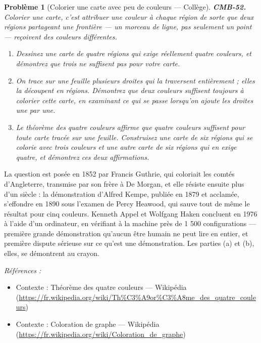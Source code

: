 \documentclass[11pt]{article}
\newtheorem{problem}{Problème}
\newenvironment{refs}{\par\small\noindent\emph{Références :}\begin{itemize}\setlength\itemsep{0pt}}{\end{itemize}\normalsize}
\begin{document}
\begin{problem}[{Colorier une carte avec peu de couleurs --- Collège}]
\textbf{CMB-52.} Colorier une carte, c'est attribuer une couleur à chaque région de sorte que
deux régions partageant une frontière --- un morceau de ligne, pas seulement un point --- reçoivent
des couleurs différentes.
\begin{enumerate}
\item[(a)] Dessinez une carte de quatre régions qui exige réellement quatre couleurs, et démontrez que
trois ne suffisent pas pour votre carte.
\item[(b)] On trace sur une feuille plusieurs droites qui la traversent entièrement ; elles la découpent
en régions. Démontrez que deux couleurs suffisent toujours à colorier cette carte, en examinant ce
qui se passe lorsqu'on ajoute les droites une par une.
\item[(c)] Le théorème des quatre couleurs affirme que quatre couleurs suffisent pour toute carte tracée
sur une feuille. Construisez une carte de six régions qui se colorie avec trois couleurs et une
autre carte de six régions qui en exige quatre, et démontrez ces deux affirmations.
\end{enumerate}

\end{problem}

\noindent La question est posée en 1852 par Francis Guthrie, qui coloriait les comtés
d'Angleterre, transmise par son frère à De Morgan, et elle résiste ensuite plus d'un siècle : la
démonstration d'Alfred Kempe, publiée en 1879 et acclamée, s'effondre en 1890 sous l'examen de
Percy Heawood, qui sauve tout de même le résultat pour cinq couleurs. Kenneth Appel et Wolfgang
Haken concluent en 1976 à l'aide d'un ordinateur, en vérifiant à la machine près de 1 500
configurations --- première grande démonstration qu'aucun être humain ne peut lire en entier, et
première dispute sérieuse sur ce qu'est une démonstration. Les parties (a) et (b), elles, se
démontrent au crayon.

\begin{refs}
\item Contexte : Théorème des quatre couleurs --- Wikipédia (\url{https://fr.wikipedia.org/wiki/Th%C3%A9or%C3%A8me_des_quatre_couleurs})
\item Contexte : Coloration de graphe --- Wikipédia (\url{https://fr.wikipedia.org/wiki/Coloration_de_graphe})
\end{refs}

\bigskip
\end{document}
